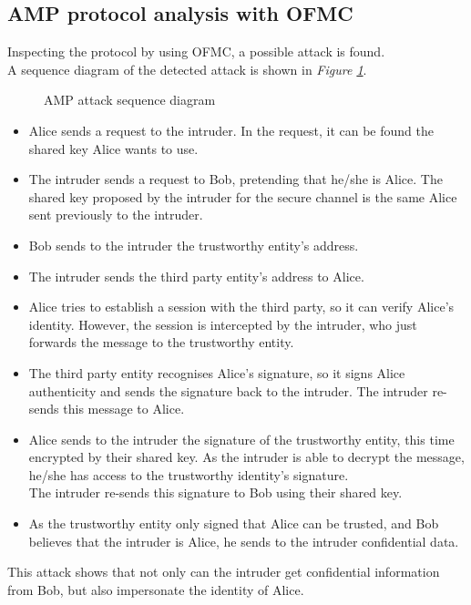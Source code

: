 \subsection{AMP protocol analysis with OFMC}\label{subsec:amp2}

Inspecting the protocol by using OFMC, a possible attack is found.\\
A sequence diagram of the detected attack is shown in \textit{Figure \ref{fig:amptraceattack}}.
\begin{figure}[ht!]
	\centering	
	
	\caption{AMP attack sequence diagram}
	\label{fig:amptraceattack}
\end{figure}
\begin{itemize}
	\item Alice sends a request to the intruder. In the request, it can be found the shared key Alice wants to use.
	\item The intruder sends a request to Bob, pretending that he/she is Alice. The shared key proposed by the intruder for the secure channel is the same Alice sent previously to the intruder.
	\item Bob sends to the intruder the trustworthy entity's address.
	\item The intruder sends the third party entity's address to Alice.
	\item Alice tries to establish a session with the third party, so it can verify Alice's identity. However, the session is intercepted by the intruder, who just forwards the message to the trustworthy entity.
	\item The third party entity recognises Alice's signature, so it signs Alice authenticity and sends the signature back to the intruder. The intruder re-sends this message to Alice.
	\item Alice sends to the intruder the signature of the trustworthy entity, this time encrypted by their shared key. As the intruder is able to decrypt the message, he/she has access to the trustworthy identity's signature.\\
		The intruder re-sends this signature to Bob using their shared key.
	\item As the trustworthy entity only signed that Alice can be trusted, and Bob believes that the intruder is Alice, he sends to the intruder confidential data.
\end{itemize}
This attack shows that not only can the intruder get confidential information from Bob, but also impersonate the identity of Alice.

